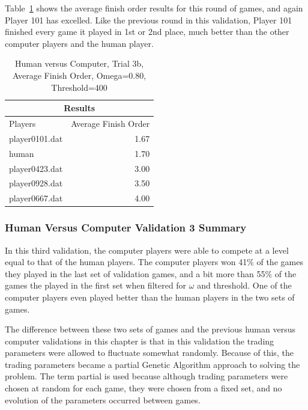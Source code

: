 Table~\ref{tab:human_results3e} shows the average finish order results for this
round of games, and again Player 101 has excelled. Like the previous round in
this validation, Player 101 finished every game it played in 1st or 2nd place,
much better than the other computer players and the human player.

\begin{table}[htbp]
  \centering
  \caption{Human versus Computer, Trial 3b, Average Finish Order, Omega=0.80, Threshold=400}
    \begin{tabular}{lr}
    \toprule
    \multicolumn{2}{c}{Results}  \\
    \midrule
    Players & Average Finish Order \\
    \multicolumn{1}{l}{player0101.dat} & 1.67 \\
    \multicolumn{1}{l}{human} & 1.70 \\
    \multicolumn{1}{l}{player0423.dat} & 3.00 \\
    \multicolumn{1}{l}{player0928.dat} & 3.50 \\
    \multicolumn{1}{l}{player0667.dat} & 4.00 \\
    \bottomrule
    \end{tabular}%
  \label{tab:human_results3e}%
\end{table}%

\subsubsection{Human Versus Computer Validation 3 Summary}

In this third validation, the computer players were able to compete at a level
equal to that of the human players. The computer players won 41\% of the games
they played in the last set of validation games, and a bit more than 55\% of the
games the played in the first set when filtered for \(\omega\) and threshold.
One of the computer players even played better than the human players in the two
sets of games.

The difference between these two sets of games and the previous human versus
computer validations in this chapter is that in this validation the trading
parameters were allowed to fluctuate somewhat randomly. Because of this, the
trading parameters became a partial Genetic Algorithm approach to solving the
problem. The term partial is used because although trading parameters were
chosen at random for each game, they were chosen from a fixed set, and no
evolution of the parameters occurred between games.

